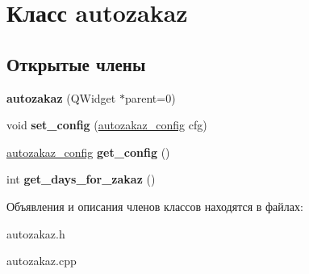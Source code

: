 \hypertarget{classautozakaz}{\section{Класс autozakaz}
\label{classautozakaz}
}
\subsection*{Открытые члены}
\begin{DoxyCompactItemize}
\item 
\hypertarget{classautozakaz_af6a87b484ef79525d46dcf68806d24c8}{{\bfseries autozakaz} (\-Q\-Widget $\ast$parent=0)}\label{classautozakaz_af6a87b484ef79525d46dcf68806d24c8}

\item 
\hypertarget{classautozakaz_a57c7e69d933b415d7a0c47ad02ef48a8}{void {\bfseries set\-\_\-config} (\hyperlink{structautozakaz__config}{autozakaz\-\_\-config} cfg)}\label{classautozakaz_a57c7e69d933b415d7a0c47ad02ef48a8}

\item 
\hypertarget{classautozakaz_a1dde87c2931f264d1744e721a4ce7028}{\hyperlink{structautozakaz__config}{autozakaz\-\_\-config} {\bfseries get\-\_\-config} ()}\label{classautozakaz_a1dde87c2931f264d1744e721a4ce7028}

\item 
\hypertarget{classautozakaz_abc2bd66f3e61d986eed87b5e1306c0e7}{int {\bfseries get\-\_\-days\-\_\-for\-\_\-zakaz} ()}\label{classautozakaz_abc2bd66f3e61d986eed87b5e1306c0e7}

\end{DoxyCompactItemize}


Объявления и описания членов классов находятся в файлах\-:\begin{DoxyCompactItemize}
\item 
autozakaz.\-h\item 
autozakaz.\-cpp\end{DoxyCompactItemize}
